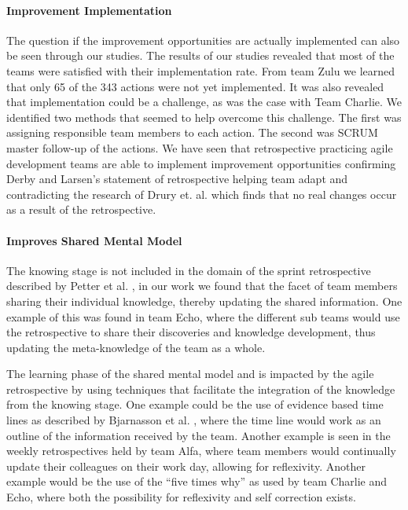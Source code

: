 \paragraph{Improvement Implementation}
The question if the improvement opportunities are actually implemented can also be seen through our studies. The results of our studies revealed that most of the teams were satisfied with their implementation rate. From team Zulu we learned that only 65 of the 343 actions were not yet implemented. It was also revealed that implementation could be a challenge, as was the case with Team Charlie. We identified two methods that seemed to help overcome this challenge. The first was assigning responsible team members to each action. The second was SCRUM master follow-up of the actions. We have seen that retrospective practicing agile development teams are able to implement improvement opportunities confirming Derby and Larsen's \cite{Larsen2006} statement of retrospective helping team adapt and contradicting the research of Drury et. al. \cite{Drury2012} which finds that no real changes occur as a result of the retrospective. 

\paragraph{Improves Shared Mental Model}
The knowing stage is not included in the domain of the sprint retrospective described by Petter et al. \cite{Petter2013}, in our work we found that the facet of team members sharing their individual knowledge, thereby updating the shared information. One example of this was found in team Echo, where the different sub teams would use the retrospective to share their discoveries and knowledge development, thus updating the meta-knowledge of the team as a whole. 

The learning phase of the shared mental model and is impacted by the agile retrospective by using techniques that facilitate the integration of the knowledge from the knowing stage. One example could be the use of evidence based time lines as described by Bjarnasson et al. \cite{Bjarnason2012}, where the time line would work as an outline of the information received by the team. Another example is seen in the weekly retrospectives held by team Alfa, where team members would continually update their colleagues on their work day, allowing for reflexivity. Another example would be the use of the ``five times why'' as used by team Charlie and Echo, where both the possibility for reflexivity and self correction exists.

